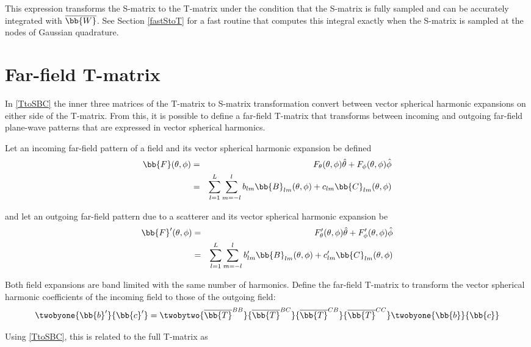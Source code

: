 This expression transforms the S-matrix to the T-matrix under the condition that the S-matrix is fully sampled and can be accurately integrated with $\overline{\bb{W}}$. See Section \ref{fastStoT} for a fast routine that computes this integral exactly when the S-matrix is sampled at the nodes of Gaussian quadrature. 

\section{Far-field T-matrix}

In \eqref{TtoSBC} the inner three matrices of the T-matrix to S-matrix transformation convert between vector spherical harmonic expansions on either side of the T-matrix. From this, it is possible to define a far-field T-matrix that transforms between incoming and outgoing far-field plane-wave patterns that are expressed in vector spherical harmonics.

Let an incoming far-field pattern of a field and its vector spherical harmonic expansion be defined
\begin{eqnarray}
\bb{F}(\theta,\phi) &=& F_{\theta}(\theta,\phi) \hat\theta + F_{\phi}(\theta,\phi) \hat\phi \\
\ & = & \sum_{l=1}^{L} \sum_{m = -l}^{l} b_{lm} \bb{B}_{lm}(\theta,\phi) + c_{lm} \bb{C}_{lm}(\theta,\phi)
\end{eqnarray}

\noindent and let an outgoing far-field pattern due to a scatterer and its vector spherical harmonic expansion be
\begin{eqnarray}
\bb{F}'(\theta,\phi) &=& F_{\theta}'(\theta,\phi) \hat\theta + F_{\phi}'(\theta,\phi) \hat\phi \\
\ & = & \sum_{l=1}^{L} \sum_{m = -l}^{l} b_{lm}' \bb{B}_{lm}(\theta,\phi) + c_{lm}' \bb{C}_{lm}(\theta,\phi)
\end{eqnarray}

Both field expansions are band limited with the same number of harmonics. Define the far-field T-matrix to transform the vector spherical harmonic coefficients of the incoming field to those of the outgoing field:
\begin{equation}
\twobyone{\bb{b}'}{\bb{c}'} = \twobytwo{\overline{\bb{T}}^{BB}}{\overline{\bb{T}}^{BC}}{\overline{\bb{T}}^{CB}}{\overline{\bb{T}}^{CC}}\twobyone{\bb{b}}{\bb{c}} \label{TBC}
\end{equation}

Using \eqref{TtoSBC}, this is related to the full T-matrix as

